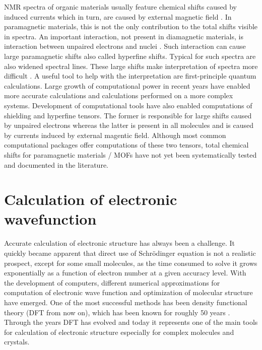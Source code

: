 \documentclass[openany, longbibliography,slovene,a4paper,12pt]{article}
\begin{document}
 NMR spectra of organic materials usually feature chemical shifts caused by
 induced currents which in turn, are caused by external magnetic field
 \cite{chemic_shift_tensor_review}. In paramagnetic materials, this is not the
 only contribution to the total shifts visible in spectra. An important
 interaction, not present in  diamagnetic materials, is interaction between
 unpaired electrons and nuclei
 \cite{Dft_Investigation_of_the_Effect_of_Spin_Orbit}.
 Such interaction can cause large paramagnetic
 shifts also called hyperfine shifts. Typical for such spectra are also widened
 spectral lines. These large shifts make interpretation of spectra more difficult
 \cite{Dft_Investigation_of_the_Effect_of_Spin_Orbit}. A useful tool to help
 with the interpretation are first-principle quantum calculations. Large growth
 of computational power in recent years have enabled more accurate calculations
 and calculations performed on a more complex systems. Development of
 computational tools have also enabled computations of shielding and hyperfine
 tensors. The former is responsible for large shifts caused by unpaired
 electrons whereas the latter is present in all molecules and is caused by
 currents induced by external magentic field. Although most common computational
 packages offer computations of these two tensors, total chemical shifts for
 paramagnetic materials / MOFs have not yet been systematically tested and
 documented in the literature.

\section{Calculation of electronic wavefunction}
Accurate calculation of electronic structure has always been a challenge. It
quickly became apparent that direct use of Schr{\"o}dinger equation is not a
realistic prospect, except for some small
molecules, as the time consumed to solve it grows exponentially
\cite{nobel_lecture} as a function of electron
number at a given accuracy level. With the development of computers, different
numerical approximations for computation of electronic wave function and
optimization of molecular structure have emerged. One of the most successful methods has been density functional theory
(DFT from now on), which has been known for roughly 50 years \cite{nobel_lecture}. Through the years DFT has evolved and today it represents one of the main tools for calculation of electronic structure especially for complex molecules and crystals.
\end{document}

